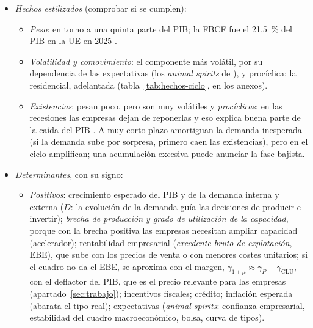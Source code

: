 \documentclass[11pt]{article}
\begin{document}
\begin{itemize}
\item \emph{Hechos estilizados} (comprobar si se cumplen):
  \begin{itemize}
  \item \emph{Peso}: en torno a una quinta parte del PIB; la FBCF fue el 21,5~\% del PIB en la UE en 2025 \parencite{Eurostat2026nama10gdp}.
  \item \emph{Volatilidad y comovimiento}: el componente más volátil, por su dependencia de las expectativas (los \emph{animal spirits} de \textcite{Keynes1936}), y procíclica; la residencial, adelantada (tabla~\ref{tab:hechos-ciclo}, en los anexos).
  \item \emph{Existencias}: pesan poco, pero son muy volátiles y \emph{procíclicas}: en las recesiones las empresas dejan de reponerlas y eso explica buena parte de la caída del PIB \parencite{BlinderMaccini1991Existencias}. A muy corto plazo amortiguan la demanda inesperada (si la demanda sube por sorpresa, primero caen las existencias), pero en el ciclo amplifican; una acumulación excesiva puede anunciar la fase bajista.
  \end{itemize}
\item \emph{Determinantes}, con su signo:
  \begin{itemize}
  \item \emph{Positivos}: crecimiento esperado del PIB y de la demanda interna y externa ($D$: la evolución de la demanda guía las decisiones de producir e invertir); \emph{brecha de producción y grado de utilización de la capacidad}, porque con la brecha positiva las empresas necesitan ampliar capacidad (acelerador); rentabilidad empresarial (\emph{excedente bruto de explotación}, EBE), que sube con los precios de venta o con menores costes unitarios; si el cuadro no da el EBE, se aproxima con el margen, $\gamma_{1+\mu}\approx\gamma_P-\gamma_{\mathrm{CLU}}$, con el deflactor del PIB, que es el precio relevante para las empresas (apartado~\ref{sec:trabajo}); incentivos fiscales; crédito; inflación esperada (abarata el tipo real); expectativas (\emph{animal spirits}: confianza empresarial, estabilidad del cuadro macroeconómico, bolsa, curva de tipos).

\end{itemize}
\end{itemize}
\end{document}
